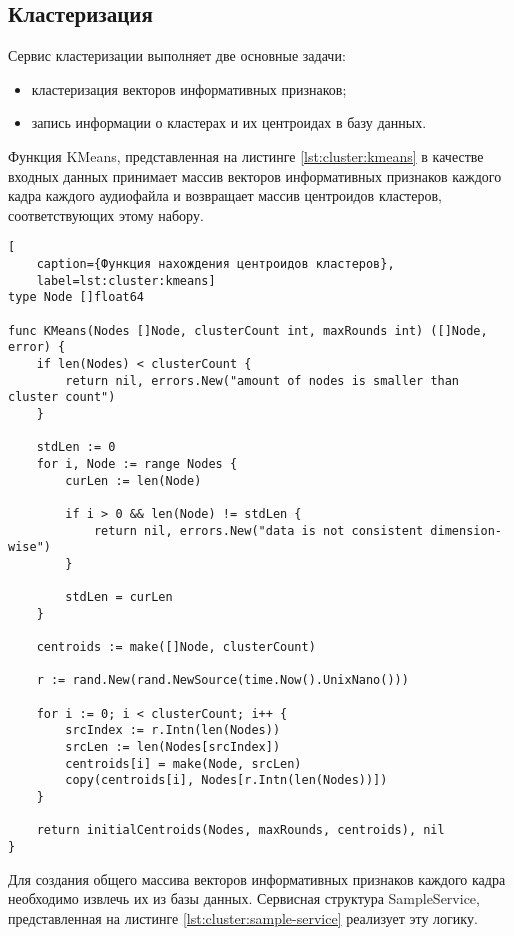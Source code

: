 \subsection{Кластеризация}
Сервис кластеризации выполняет две основные задачи:
\begin{itemize}
	\item кластеризация векторов информативных признаков;
	\item запись информации о кластерах и их центроидах в базу данных.
\end{itemize}
Функция KMeans, представленная на листинге \ref{lst:cluster:kmeans} в качестве входных данных принимает массив векторов информативных признаков каждого кадра каждого аудиофайла и возвращает массив центроидов кластеров, соответствующих этому набору.
\begin{lstlisting}[
	caption={Функция нахождения центроидов кластеров},
	label=lst:cluster:kmeans]
type Node []float64

func KMeans(Nodes []Node, clusterCount int, maxRounds int) ([]Node, error) {
    if len(Nodes) < clusterCount {
        return nil, errors.New("amount of nodes is smaller than cluster count")
    }

    stdLen := 0
    for i, Node := range Nodes {
        curLen := len(Node)

        if i > 0 && len(Node) != stdLen {
            return nil, errors.New("data is not consistent dimension-wise")
        }

        stdLen = curLen
    }

    centroids := make([]Node, clusterCount)

    r := rand.New(rand.NewSource(time.Now().UnixNano()))

    for i := 0; i < clusterCount; i++ {
        srcIndex := r.Intn(len(Nodes))
        srcLen := len(Nodes[srcIndex])
        centroids[i] = make(Node, srcLen)
        copy(centroids[i], Nodes[r.Intn(len(Nodes))])
    }

    return initialCentroids(Nodes, maxRounds, centroids), nil
}
\end{lstlisting}
Для создания общего массива векторов информативных признаков каждого кадра необходимо извлечь их из базы данных. Сервисная структура SampleService, представленная на листинге \ref{lst:cluster:sample-service} реализует эту логику. 
